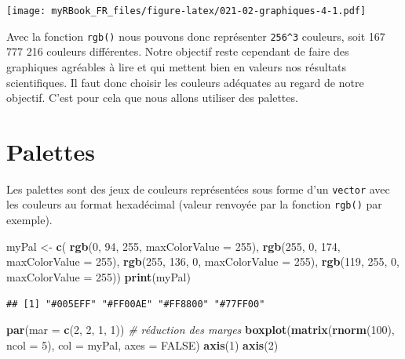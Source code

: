 \documentclass[
]{book}
\newenvironment{Shaded}{\begin{snugshade}}{\end{snugshade}}
\newcommand{\CommentTok}[1]{\textcolor[rgb]{0.56,0.35,0.01}{\textit{#1}}}
\newcommand{\DataTypeTok}[1]{\textcolor[rgb]{0.13,0.29,0.53}{#1}}
\newcommand{\DecValTok}[1]{\textcolor[rgb]{0.00,0.00,0.81}{#1}}
\newcommand{\KeywordTok}[1]{\textcolor[rgb]{0.13,0.29,0.53}{\textbf{#1}}}
\newcommand{\NormalTok}[1]{#1}
\newcommand{\OtherTok}[1]{\textcolor[rgb]{0.56,0.35,0.01}{#1}}
\newcommand{\StringTok}[1]{\textcolor[rgb]{0.31,0.60,0.02}{#1}}
\begin{document}
\texttt{[image: myRBook\_FR\_files/figure-latex/021-02-graphiques-4-1.pdf]}

Avec la fonction \texttt{rgb()} nous pouvons donc représenter \texttt{256\^{}3} couleurs, soit 167 777 216 couleurs différentes. Notre objectif reste cependant de faire des graphiques agréables à lire et qui mettent bien en valeurs nos résultats scientifiques. Il faut donc choisir les couleurs adéquates au regard de notre objectif. C'est pour cela que nous allons utiliser des palettes.

\hypertarget{palettes}{%
\section{Palettes}\label{palettes}}

Les palettes sont des jeux de couleurs représentées sous forme d'un \texttt{vector} avec les couleurs au format hexadécimal (valeur renvoyée par la fonction \texttt{rgb()} par exemple).

\begin{Shaded}
\begin{Highlighting}[]
\NormalTok{myPal <-}\StringTok{ }\KeywordTok{c}\NormalTok{(}
  \KeywordTok{rgb}\NormalTok{(}\DecValTok{0}\NormalTok{, }\DecValTok{94}\NormalTok{, }\DecValTok{255}\NormalTok{, }\DataTypeTok{maxColorValue =} \DecValTok{255}\NormalTok{),  }
  \KeywordTok{rgb}\NormalTok{(}\DecValTok{255}\NormalTok{, }\DecValTok{0}\NormalTok{, }\DecValTok{174}\NormalTok{, }\DataTypeTok{maxColorValue =} \DecValTok{255}\NormalTok{),  }
  \KeywordTok{rgb}\NormalTok{(}\DecValTok{255}\NormalTok{, }\DecValTok{136}\NormalTok{, }\DecValTok{0}\NormalTok{, }\DataTypeTok{maxColorValue =} \DecValTok{255}\NormalTok{),  }
  \KeywordTok{rgb}\NormalTok{(}\DecValTok{119}\NormalTok{, }\DecValTok{255}\NormalTok{, }\DecValTok{0}\NormalTok{, }\DataTypeTok{maxColorValue =} \DecValTok{255}\NormalTok{))}
\KeywordTok{print}\NormalTok{(myPal)}
\end{Highlighting}
\end{Shaded}

\begin{verbatim}
## [1] "#005EFF" "#FF00AE" "#FF8800" "#77FF00"
\end{verbatim}

\begin{Shaded}
\begin{Highlighting}[]
\KeywordTok{par}\NormalTok{(}\DataTypeTok{mar =} \KeywordTok{c}\NormalTok{(}\DecValTok{2}\NormalTok{, }\DecValTok{2}\NormalTok{, }\DecValTok{1}\NormalTok{, }\DecValTok{1}\NormalTok{)) }\CommentTok{# réduction des marges}
\KeywordTok{boxplot}\NormalTok{(}\KeywordTok{matrix}\NormalTok{(}\KeywordTok{rnorm}\NormalTok{(}\DecValTok{100}\NormalTok{), }\DataTypeTok{ncol =} \DecValTok{5}\NormalTok{), }\DataTypeTok{col =}\NormalTok{ myPal, }\DataTypeTok{axes =} \OtherTok{FALSE}\NormalTok{)}
\KeywordTok{axis}\NormalTok{(}\DecValTok{1}\NormalTok{)}
\KeywordTok{axis}\NormalTok{(}\DecValTok{2}\NormalTok{)}
\end{Highlighting}
\end{Shaded}
\end{document}
